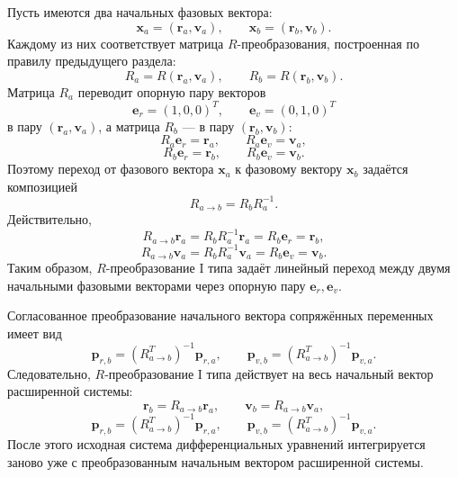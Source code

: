 Пусть имеются два начальных фазовых вектора:
\begin{equation}
\mathbf x_a=(\mathbf r_a,\mathbf v_a),
\qquad
\mathbf x_b=(\mathbf r_b,\mathbf v_b).
\end{equation}
Каждому из них соответствует матрица \(R\)-преобразования, построенная по правилу предыдущего раздела:
\begin{equation}
R_a=R(\mathbf r_a,\mathbf v_a),
\qquad
R_b=R(\mathbf r_b,\mathbf v_b).
\end{equation}
Матрица \(R_a\) переводит опорную пару векторов
\begin{equation}
\mathbf e_r=(1,0,0)^T,
\qquad
\mathbf e_v=(0,1,0)^T
\end{equation}
в пару \((\mathbf r_a,\mathbf v_a)\), а матрица \(R_b\) --- в пару \((\mathbf r_b,\mathbf v_b)\):
\begin{equation}
R_a\mathbf e_r=\mathbf r_a,\qquad
R_a\mathbf e_v=\mathbf v_a,
\end{equation}
\begin{equation}
R_b\mathbf e_r=\mathbf r_b,\qquad
R_b\mathbf e_v=\mathbf v_b.
\end{equation}
Поэтому переход от фазового вектора \(\mathbf x_a\) к фазовому вектору \(\mathbf x_b\) задаётся композицией
\begin{equation}
R_{a\to b}=R_b R_a^{-1}.
\end{equation}
Действительно,
\begin{equation}
R_{a\to b}\mathbf r_a
=
R_b R_a^{-1}\mathbf r_a
=
R_b\mathbf e_r
=
\mathbf r_b,
\end{equation}
\begin{equation}
R_{a\to b}\mathbf v_a
=
R_b R_a^{-1}\mathbf v_a
=
R_b\mathbf e_v
=
\mathbf v_b.
\end{equation}
Таким образом, \(R\)-преобразование I типа задаёт линейный переход между двумя начальными фазовыми векторами через опорную пару \(\mathbf e_r,\mathbf e_v\).

Согласованное преобразование начального вектора сопряжённых переменных имеет вид
\begin{equation}
\mathbf p_{r,b}=(R_{a\to b}^{T})^{-1}\mathbf p_{r,a},
\qquad
\mathbf p_{v,b}=(R_{a\to b}^{T})^{-1}\mathbf p_{v,a}.
\end{equation}
Следовательно, \(R\)-преобразование I типа действует на весь начальный вектор расширенной системы:
\begin{equation}
\mathbf r_b=R_{a\to b}\mathbf r_a,
\qquad
\mathbf v_b=R_{a\to b}\mathbf v_a,
\end{equation}
\begin{equation}
\mathbf p_{r,b}=(R_{a\to b}^{T})^{-1}\mathbf p_{r,a},
\qquad
\mathbf p_{v,b}=(R_{a\to b}^{T})^{-1}\mathbf p_{v,a}.
\end{equation}
После этого исходная система дифференциальных уравнений интегрируется заново уже с преобразованным начальным вектором расширенной системы.

